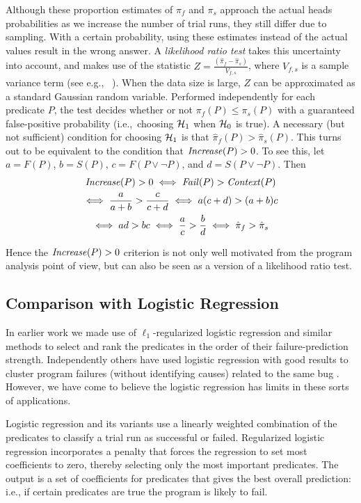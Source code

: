 Although these proportion estimates of $\pi_f$ and $\pi_s$ approach the
actual heads probabilities as we increase the number of trial runs, they
still differ due to sampling.  With a certain probability, using these
estimates instead of the actual values result in the wrong
answer.  A \textit{likelihood ratio test} takes this uncertainty into
account, and makes use of the statistic $ Z = \frac{(\hat \pi_f - \hat
  \pi_s)}{V_{f,s}}$, where $V_{f,s}$ is a sample variance term (see
e.g., ~\cite{Lehmann:1986:hyptest}).  When
the data size is large, $Z$ can be approximated as a standard Gaussian
random variable.  Performed independently for each predicate $P$, the
test decides whether or not $\pi_f(P) \leq \pi_s(P)$ with a guaranteed
false-positive probability (i.e.,\ choosing ${\mathcal{H}}_1$ when ${\mathcal{H}}_0$ is true).
A necessary (but not sufficient) condition for choosing ${\mathcal{H}}_1$ is that
$\hat \pi_f(P) > \hat \pi_s(P)$.  This turns out to be
equivalent to the condition that $\mbox{\textit{Increase}}(P) > 0$.  To see this,
let $a = F(P)$, $b = S(P)$, $c = F(P\lor\lnot P)$, and $d = S(P\lor\lnot P)$.
Then
\begin{gather*}
  \mbox{\textit{Increase}}(P) > 0 \iff \mbox{\textit{Fail}}(P) > \mbox{\textit{Context}}(P) \\
  \iff \frac{a}{a+b} > \frac{c}{c+d}
  \iff a (c+d) > (a+b) c \\
  \iff ad > bc \iff \frac{a}{c} > \frac{b}{d}
  \iff \hat \pi_f > \hat \pi_s
\end{gather*}

Hence the $\mbox{\textit{Increase}}(P) > 0$ criterion is not only well motivated
from the program analysis point of view, but can also be seen as a
version of a likelihood ratio test.

\subsection{Comparison with Logistic Regression}
\label{sec:comparison}

In earlier work \cite{PLDI`03*141,Zheng:2003:SDSP}
we made use of $\ell_1$-regularized logistic regression and similar
methods to select and rank the predicates in the order of their
failure-prediction strength.  Independently others have used
logistic regression with good results to cluster program failures (without
identifying causes) related to the same bug \cite{ICSE`03*465}.  However, we have come
to believe the logistic regression has limits
in these sorts of applications. 

Logistic regression and its variants use a linearly weighted
combination of the predicates to classify a trial run as successful or
failed.  Regularized logistic regression incorporates a penalty
that forces the regression to set most coefficients to zero, thereby
selecting only the most important predicates.  The output is a set of
coefficients for predicates that gives the best overall prediction: i.e., if
certain predicates are true the program is likely to fail.

